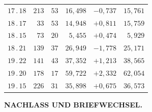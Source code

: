 \begin{center}
\begin{tabular}[t]{|c|r@{\;}r@{\;}r|r|r|}
$17\, .\, 18$ & $213$ & $53$ & $16{,}498$ & $-0{,}737$ & $15{,}761$\\[7pt]
$18\, .\, 17$ & $33$ & $53$ & $14{,}948$ & $+0{,}811$ & $15{,}759$\\
$18\, .\, 15$ & $73$ & $20$ & $5{,}455$ & $+0{,}474$ & $5{,}929$\\
$18\, .\, 21$ & $139$ & $37$ & $26{,}949$ & $-1{,}778$ & $25{,}171$\\[7pt]
$19\, .\, 22$ & $141$ & $43$ & $37{,}352$ & $+1{,}213$ & $38{,}565$\\
$19\, .\, 20$ & $178$ & $17$ & $59{,}722$ & $+2{,}332$ & $62{,}054$\\
$19\, .\, 15$ & $226$ & $31$ & $35{,}898$ & $+0{,}675$ & $36{,}573$\\
\end{tabular}
\end{center}
\clearpage
{}\hfill\textbf{NACHLASS UND BRIEFWECHSEL.}
